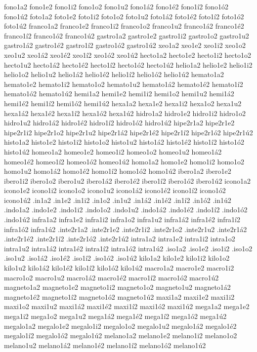 {fono1a2 fono1e2 fono1i2 fono1o2 fono1u2 fono1á2 fono1é2 fono1í2 fono1ó2 fono1ú2
foto1a2 foto1e2 foto1i2 foto1o2 foto1u2 foto1á2 foto1é2 foto1í2 foto1ó2 foto1ú2
franco1a2 franco1e2 franco1i2 franco1o2 franco1u2 franco1á2 franco1é2 franco1í2 franco1ó2 franco1ú2
gastro1a2 gastro1e2 gastro1i2 gastro1o2 gastro1u2 gastro1á2 gastro1é2 gastro1í2 gastro1ó2 gastro1ú2
xeo1a2 xeo1e2 xeo1i2 xeo1o2 xeo1u2 xeo1á2 xeo1é2 xeo1í2 xeo1ó2 xeo1ú2
hecto1a2 hecto1e2 hecto1i2 hecto1o2 hecto1u2 hecto1á2 hecto1é2 hecto1í2 hecto1ó2 hecto1ú2
helio1a2 helio1e2 helio1i2 helio1o2 helio1u2 helio1á2 helio1é2 helio1í2 helio1ó2 helio1ú2
hemato1a2 hemato1e2 hemato1i2 hemato1o2 hemato1u2 hemato1á2 hemato1é2 hemato1í2 hemato1ó2 hemato1ú2
hemi1a2 hemi1e2 hemi1i2 hemi1o2 hemi1u2 hemi1á2 hemi1é2 hemi1í2 hemi1ó2 hemi1ú2
hexa1a2 hexa1e2 hexa1i2 hexa1o2 hexa1u2 hexa1á2 hexa1é2 hexa1í2 hexa1ó2 hexa1ú2
hidro1a2 hidro1e2 hidro1i2 hidro1o2 hidro1u2 hidro1á2 hidro1é2 hidro1í2 hidro1ó2 hidro1ú2
hipe2r1a2 hipe2r1e2 hipe2r1i2 hipe2r1o2 hipe2r1u2 hipe2r1á2 hipe2r1é2 hipe2r1í2 hipe2r1ó2 hipe2r1ú2
histo1a2 histo1e2 histo1i2 histo1o2 histo1u2 histo1á2 histo1é2 histo1í2 histo1ó2 histo1ú2
homeo1a2 homeo1e2 homeo1i2 homeo1o2 homeo1u2 homeo1á2 homeo1é2 homeo1í2 homeo1ó2 homeo1ú2
homo1a2 homo1e2 homo1i2 homo1o2 homo1u2 homo1á2 homo1é2 homo1í2 homo1ó2 homo1ú2
ibero1a2 ibero1e2 ibero1i2 ibero1o2 ibero1u2 ibero1á2 ibero1é2 ibero1í2 ibero1ó2 ibero1ú2
icono1a2 icono1e2 icono1i2 icono1o2 icono1u2 icono1á2 icono1é2 icono1í2 icono1ó2 icono1ú2
.in1a2 .in1e2 .in1i2 .in1o2 .in1u2 .in1á2 .in1é2 .in1í2 .in1ó2 .in1ú2
.indo1a2 .indo1e2 .indo1i2 .indo1o2 .indo1u2 .indo1á2 .indo1é2 .indo1í2 .indo1ó2 .indo1ú2
infra1a2 infra1e2 infra1i2 infra1o2 infra1u2 infra1á2 infra1é2 infra1í2 infra1ó2 infra1ú2
.inte2r1a2 .inte2r1e2 .inte2r1i2 .inte2r1o2 .inte2r1u2 .inte2r1á2 .inte2r1é2 .inte2r1í2 .inte2r1ó2 .inte2r1ú2
intra1a2 intra1e2 intra1i2 intra1o2 intra1u2 intra1á2 intra1é2 intra1í2 intra1ó2 intra1ú2
.iso1a2 .iso1e2 .iso1i2 .iso1o2 .iso1u2 .iso1á2 .iso1é2 .iso1í2 .iso1ó2 .iso1ú2
kilo1a2 kilo1e2 kilo1i2 kilo1o2 kilo1u2 kilo1á2 kilo1é2 kilo1í2 kilo1ó2 kilo1ú2
macro1a2 macro1e2 macro1i2 macro1o2 macro1u2 macro1á2 macro1é2 macro1í2 macro1ó2 macro1ú2
magneto1a2 magneto1e2 magneto1i2 magneto1o2 magneto1u2 magneto1á2 magneto1é2 magneto1í2 magneto1ó2 magneto1ú2
maxi1a2 maxi1e2 maxi1i2 maxi1o2 maxi1u2 maxi1á2 maxi1é2 maxi1í2 maxi1ó2 maxi1ú2
mega1a2 mega1e2 mega1i2 mega1o2 mega1u2 mega1á2 mega1é2 mega1í2 mega1ó2 mega1ú2
megalo1a2 megalo1e2 megalo1i2 megalo1o2 megalo1u2 megalo1á2 megalo1é2 megalo1í2 megalo1ó2 megalo1ú2
melano1a2 melano1e2 melano1i2 melano1o2 melano1u2 melano1á2 melano1é2 melano1í2 melano1ó2 melano1ú2
}
